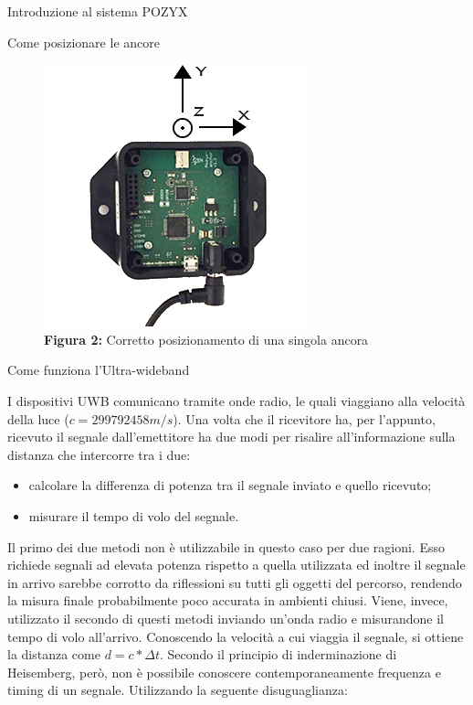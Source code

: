 \documentclass[12pt]{report}
\begin{document}
\begin{section}{Introduzione al sistema POZYX}
\begin{subsection}{Come posizionare le ancore}
		\begin{figure}[h]
			\centering
			\includegraphics[scale=1.8]{anchor_placement}
	 		\caption{\textbf{Figura 2:} Corretto posizionamento di una singola ancora}\label{Fanchor}
		\end{figure}

	\end{subsection}

	\begin{subsection}{Come funziona l'Ultra-wideband}

		I dispositivi UWB comunicano tramite onde radio, le quali viaggiano alla velocità della luce ($c=299792458m/s$). Una volta che il ricevitore ha, per l’appunto, ricevuto il segnale dall’emettitore ha due modi per risalire all’informazione sulla distanza che intercorre tra i due:

		\begin{itemize}
				\item calcolare la differenza di potenza tra il segnale inviato e quello ricevuto; 
				\item misurare il tempo di volo del segnale.
		\end{itemize}
		Il primo dei due metodi non è utilizzabile in questo caso per due ragioni. Esso richiede segnali ad elevata potenza rispetto a quella utilizzata ed inoltre il segnale in arrivo sarebbe corrotto da riflessioni su tutti gli oggetti del percorso, rendendo la misura finale probabilmente poco accurata in ambienti chiusi. Viene, 				invece, utilizzato il secondo di questi metodi inviando un’onda radio e misurandone il tempo di volo all'arrivo. Conoscendo la velocità a cui viaggia il segnale, si ottiene la distanza come $d = c* \Delta t$. Secondo il principio di inderminazione di Heisemberg, però, non è possibile conoscere contemporaneamente 				frequenza e timing di un segnale. Utilizzando la seguente disuguaglianza:


\end{subsection}
\end{section}
\end{document}
